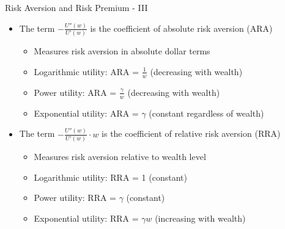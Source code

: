 \documentclass[10pt]{beamer}
\begin{document}
\begin{frame}{Risk Aversion and Risk Premium - III}
    \begin{itemize}[<+->]
      \item The term $-\frac{U''(w)}{U'(w)}$ is the coefficient of absolute risk aversion (ARA)
        \begin{itemize}
          \item Measures risk aversion in absolute dollar terms
          \item Logarithmic utility: ARA = $\frac{1}{w}$ (decreasing with wealth)
          \item Power utility: ARA = $\frac{\gamma}{w}$ (decreasing with wealth)
          \item Exponential utility: ARA = $\gamma$ (constant regardless of wealth)
        \end{itemize}
      \item The term $-\frac{U''(w)}{U'(w)} \cdot w$ is the coefficient of relative risk aversion (RRA)
        \begin{itemize}
          \item Measures risk aversion relative to wealth level
          \item Logarithmic utility: RRA = 1 (constant)
          \item Power utility: RRA = $\gamma$ (constant)
          \item Exponential utility: RRA = $\gamma w$ (increasing with wealth)
        \end{itemize}
    \end{itemize}
\end{frame}
\end{document}

